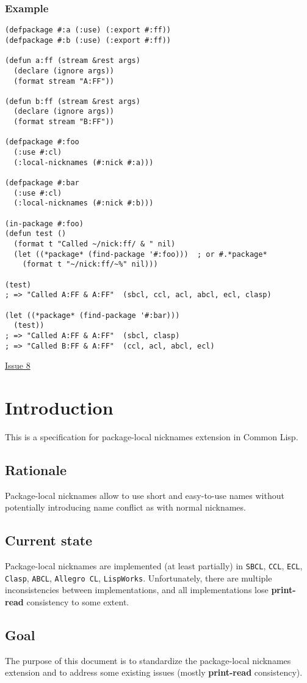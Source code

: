 \documentclass[11pt]{article}
\begin{document}
\subsubsection{Example}
\label{sec:org0749b93}
\begin{verbatim}
(defpackage #:a (:use) (:export #:ff))
(defpackage #:b (:use) (:export #:ff))

(defun a:ff (stream &rest args)
  (declare (ignore args))
  (format stream "A:FF"))

(defun b:ff (stream &rest args)
  (declare (ignore args))
  (format stream "B:FF"))

(defpackage #:foo
  (:use #:cl)
  (:local-nicknames (#:nick #:a)))

(defpackage #:bar
  (:use #:cl)
  (:local-nicknames (#:nick #:b)))

(in-package #:foo)
(defun test ()
  (format t "Called ~/nick:ff/ & " nil)
  (let ((*package* (find-package '#:foo)))  ; or #.*package*
    (format t "~/nick:ff/~%" nil)))

(test)
; => "Called A:FF & A:FF"  (sbcl, ccl, acl, abcl, ecl, clasp)

(let ((*package* (find-package '#:bar)))
  (test))
; => "Called A:FF & A:FF"  (sbcl, clasp)
; => "Called B:FF & A:FF"  (ccl, acl, abcl, ecl)
\end{verbatim}
\href{./issues/8.org}{Issue 8}
\section{Introduction}
\label{sec:orgaf5e85b}
This is a specification for package-local nicknames extension in Common Lisp.
\subsection{Rationale}
\label{sec:org600b6db}
Package-local nicknames allow to use short and easy-to-use names without
potentially introducing name conflict as with normal nicknames.
\subsection{Current state}
\label{sec:org5ba6e5a}
Package-local nicknames are implemented (at least partially) in \texttt{SBCL},
\texttt{CCL}, \texttt{ECL}, \texttt{Clasp}, \texttt{ABCL}, \texttt{Allegro CL}, \texttt{LispWorks}. Unfortunately,
there are multiple inconsistencies between implementations, and all
implementations lose \textbf{print-read} consistency to some extent.
\subsection{Goal}
\label{sec:orgf780f74}
The purpose of this document is to standardize the package-local nicknames
extension and to address some existing issues (mostly \textbf{print-read}
consistency).
\end{document}
